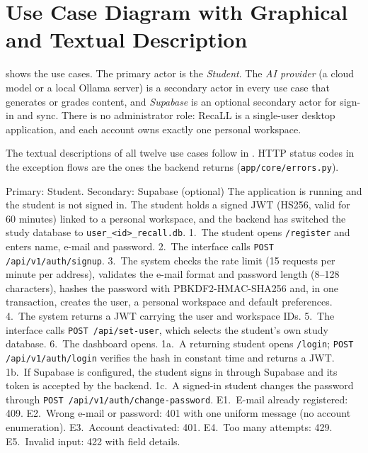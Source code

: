 \section{Use Case Diagram with Graphical and Textual Description}

 shows the use cases. The primary actor is the \emph{Student}. The
\emph{AI provider} (a cloud model or a local Ollama server) is a secondary actor in every
use case that generates or grades content, and \emph{Supabase} is an optional secondary
actor for sign-in and sync. There is no administrator role: RecaLL is a single-user desktop
application, and each account owns exactly one personal workspace.


The textual descriptions of all twelve use cases follow in
.
HTTP status codes in the exception flows are the ones the backend returns
(\texttt{app/core/errors.py}).

{Primary: Student. Secondary: Supabase (optional)}
{The application is running and the student is not signed in.}
{The student holds a signed JWT (HS256, valid for 60 minutes) linked to a personal workspace,
and the backend has switched the study database to \texttt{user\_<id>\_recall.db}.}
{1.~The student opens \texttt{/register} and enters name, e-mail and password.
2.~The interface calls \texttt{POST /api/v1/auth/signup}. 3.~The system checks the rate
limit (15 requests per minute per address), validates the e-mail format and password length
(8--128 characters), hashes the password with PBKDF2-HMAC-SHA256 and, in one transaction,
creates the user, a personal workspace and default preferences. 4.~The system returns a JWT
carrying the user and workspace IDs. 5.~The interface calls \texttt{POST /api/set-user}, which
selects the student's own study database. 6.~The dashboard opens.}
{1a.~A returning student opens \texttt{/login}; \texttt{POST /api/v1/auth/login} verifies the
hash in constant time and returns a JWT. 1b.~If Supabase is configured, the student signs in
through Supabase and its token is accepted by the backend. 1c.~A signed-in student changes the
password through \texttt{POST /api/v1/auth/change-password}.}
{E1.~E-mail already registered: 409. E2.~Wrong e-mail or password: 401 with one uniform
message (no account enumeration). E3.~Account deactivated: 401. E4.~Too many attempts: 429.
E5.~Invalid input: 422 with field details.}

